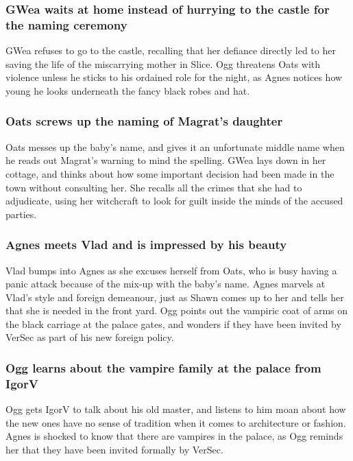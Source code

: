 \subsubsection{\Gls{GWea} waits at home instead of hurrying to the castle for the naming ceremony}
\Gls{GWea} refuses to go to the castle, recalling that her defiance directly led to her saving the
life of the miscarrying mother in Slice. \Gls{Ogg} threatens \Gls{Oats} with violence unless he
sticks to his ordained role for the night, as \Gls{Agnes} notices how young he looks underneath
the fancy black robes and hat.

\subsubsection{\Gls{Oats} screws up the naming of \Gls{Magrat}'s daughter}
\Gls{Oats} messes up the baby's name, and gives it an unfortunate middle name when he reads out
\Gls{Magrat}'s warning to mind the spelling. \Gls{GWea} lays down in her cottage, and thinks about
how some important decision had been made in the town without consulting her. She recalls all the
crimes that she had to adjudicate, using her witchcraft to look for guilt inside the minds of the
accused parties.

\subsubsection{\Gls{Agnes} meets \Gls{Vlad} and is impressed by his beauty}
\Gls{Vlad} bumps into \Gls{Agnes} as she excuses herself from \Gls{Oats}, who is busy having a
panic attack because of the mix-up with the baby's name. \Gls{Agnes} marvels at \Gls{Vlad}'s
style and foreign demeanour, just as \Gls{Shawn} comes up to her and tells her that she is needed
in the front yard. \Gls{Ogg} points out the vampiric coat of arms on the black carriage at the
palace gates, and wonders if they have been invited by \Gls{VerSec} as part of his new foreign
policy.

\subsubsection{\Gls{Ogg} learns about the vampire family at the palace from \Gls{IgorV}}
\Gls{Ogg} gets \Gls{IgorV} to talk about his old master, and listens to him moan about how the new
ones have no sense of tradition when it comes to architecture or fashion. \Gls{Agnes} is shocked
to know that there are vampires in the palace, as \Gls{Ogg} reminds her that they have been invited
formally by \Gls{VerSec}.

